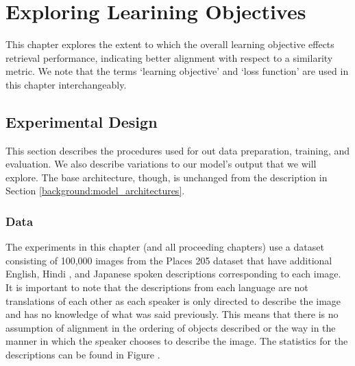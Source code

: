 \chapter{Exploring Learining Objectives}
\label{chapter:objective_exploration}

This chapter explores the extent to which the overall learning objective effects retrieval performance, indicating better alignment with respect to a similarity metric.
We note that the terms `learning objective' and `loss function' are used in this chapter interchangeably.




\section{Experimental Design}
This section describes the procedures used for out data preparation, training, and evaluation.
We also describe variations to our model's output that we will explore.
The base architecture, though, is unchanged from the description in Section \ref{background:model_architectures}.
\label{chapter:obj_exp|section:exp_design}
\subsection{Data}
The experiments in this chapter (and all proceeding chapters) use a dataset consisting of 100,000 images from the Places 205 dataset \cite{zhou2014learning} that have additional English, Hindi \cite{harwath2018interlingua}, and Japanese \cite{ohishi2020trilingual} spoken descriptions corresponding to each image.
It is important to note that the descriptions from each language are not translations of each other as each speaker is only directed to describe the image and has no knowledge of what was said previously. 
This means that there is no assumption of alignment in the ordering of objects described or the way in the manner in which the speaker chooses to describe the image.
 The statistics for the descriptions can be found in Figure \dftwrds.

